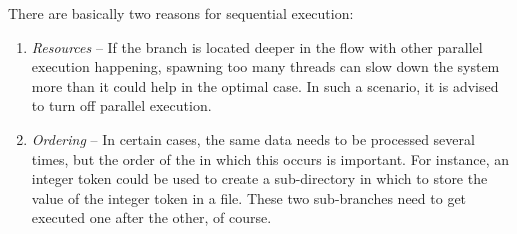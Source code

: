There are basically two reasons for sequential execution:
\begin{enumerate}
  \item \textit{Resources} -- If the branch is located deeper in the flow with
  other parallel execution happening, spawning too many threads can slow down
  the system more than it could help in the optimal case. In such a scenario, it
  is advised to turn off parallel execution.
  \item \textit{Ordering} -- In certain cases, the same data needs to be
  processed several times, but the order of the in which this occurs is
  important. For instance, an integer token could be used to create a
  sub-directory in which to store the value of the integer token in a file.
  These two sub-branches need to get executed one after the other, of course.
\end{enumerate}


